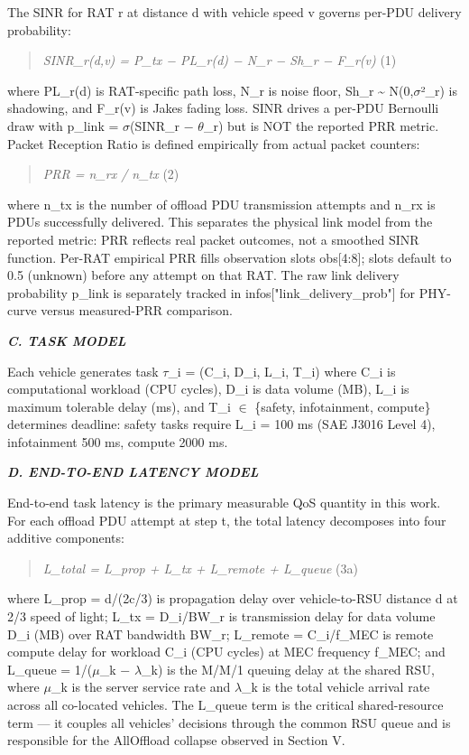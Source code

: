 \documentclass[journal,10pt,twocolumn]{IEEEtran}
\begin{document}
The SINR for RAT r at distance d with vehicle speed v governs per-PDU
delivery probability:

\begin{quote}
\emph{SINR\_r(d,v) = P\_tx − PL\_r(d) − N\_r − Sh\_r − F\_r(v)} (1)
\end{quote}

where PL\_r(d) is RAT-specific path loss, N\_r is noise floor, Sh\_r
\textasciitilde{} N(0,$\sigma$²\_r) is shadowing, and F\_r(v) is Jakes fading
loss. SINR drives a per-PDU Bernoulli draw with p\_link = $\sigma$(SINR\_r −
$\theta$\_r) but is NOT the reported PRR metric. Packet Reception Ratio is
defined empirically from actual packet counters:

\begin{quote}
\emph{PRR = n\_rx / n\_tx} (2)
\end{quote}

where n\_tx is the number of offload PDU transmission attempts and n\_rx
is PDUs successfully delivered. This separates the physical link model
from the reported metric: PRR reflects real packet outcomes, not a
smoothed SINR function. Per-RAT empirical PRR fills observation slots
obs{[}4:8{]}; slots default to 0.5 (unknown) before any attempt on that
RAT. The raw link delivery probability p\_link is separately tracked in
infos{[}"link\_delivery\_prob"{]} for PHY-curve versus measured-PRR
comparison.

\emph{\textbf{C. TASK MODEL}}

Each vehicle generates task $\tau$\_i = (C\_i, D\_i, L\_i, T\_i) where C\_i
is computational workload (CPU cycles), D\_i is data volume (MB), L\_i
is maximum tolerable delay (ms), and T\_i $\in$ \{safety, infotainment,
compute\} determines deadline: safety tasks require L\_i = 100 ms (SAE
J3016 Level 4), infotainment 500 ms, compute 2000 ms.

\emph{\textbf{D. END-TO-END LATENCY MODEL}}

End-to-end task latency is the primary measurable QoS quantity in this
work. For each offload PDU attempt at step t, the total latency
decomposes into four additive components:

\begin{quote}
\emph{L\_total = L\_prop + L\_tx + L\_remote + L\_queue} (3a)
\end{quote}

where L\_prop = d/(2c/3) is propagation delay over vehicle-to-RSU
distance d at 2/3 speed of light; L\_tx = D\_i/BW\_r is transmission
delay for data volume D\_i (MB) over RAT bandwidth BW\_r; L\_remote =
C\_i/f\_MEC is remote compute delay for workload C\_i (CPU cycles) at
MEC frequency f\_MEC; and L\_queue = 1/($\mu$\_k − $\lambda$\_k) is the M/M/1
queuing delay at the shared RSU, where $\mu$\_k is the server service rate
and $\lambda$\_k is the total vehicle arrival rate across all co-located
vehicles. The L\_queue term is the critical shared-resource term --- it
couples all vehicles' decisions through the common RSU queue and is
responsible for the AllOffload collapse observed in Section V.
\end{document}
